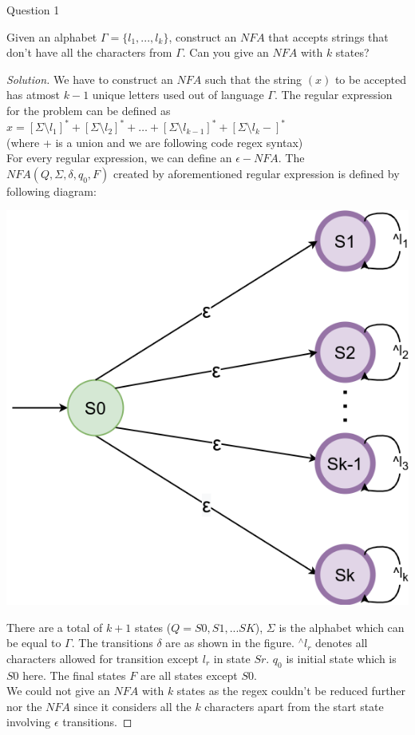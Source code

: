 \begin{solution}{Question 1}\label{ques:1}
    \begin{question}
    Given an alphabet $\Gamma = \{l_1,...,l_k\} $, construct an $NFA$ that accepts strings that don’t have all the characters from $\Gamma$. Can you give an $NFA$ with $k$ states?
    \end{question}
    \tcblower{}
    \begin{proof}[Solution]
    We have to construct an $NFA$ such that the string $(x)$ to be accepted has atmost $k-1$ unique letters used out of language $\Gamma$. The regular expression for the problem can be defined as $x = [\Sigma\setminus l_1]^* + [\Sigma\setminus l_2]^*+ \dots + [\Sigma\setminus l_{k-1}]^*+[\Sigma\setminus l_k-]^*$\\
    (where + is a union and we are following code regex syntax)\\
    For every regular expression, we can define an $\epsilon-NFA$. The $NFA (Q, \Sigma, \delta, q_0, F)$ created by aforementioned regular expression is defined by following diagram:
    \begin{center}
        \includegraphics[scale=0.6]{NFA_bigalphabet.png}
    \end{center}
    There are a total of $k+1$ states ($Q = {S0,S1,...SK}$), $\Sigma$ is the alphabet which can be equal to $\Gamma$. The transitions $\delta$ are as shown in the figure. $^\wedge l_r$ denotes all characters allowed for transition except $l_r$ in state $Sr$. $q_0$ is initial state which is $S0$ here. The final states $F$ are all states except $S0$.\\
    We could not give an $NFA$ with $k$ states as the regex couldn't be reduced further nor the $NFA$ since it considers all the $k$ characters apart from the start state involving $\epsilon$ transitions.
    
    \end{proof}
\end{solution}
